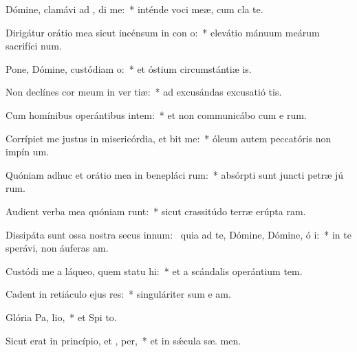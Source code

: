 \item Dómine, clamávi ad , di me:~* inténde voci meæ, cum cla  te.
\item Dirigátur orátio mea sicut incénsum in con o:~* elevátio mánuum meárum sacrifíci num.
\item Pone, Dómine, custódiam  o:~* et óstium circumstántiæ  is.
\item Non declínes cor meum in ver tiæ:~* ad excusándas excusatió  tis.
\item Cum homínibus operántibus intem:~* et non communicábo cum e rum.
\item Corrípiet me justus in misericórdia, et bit me:~* óleum autem peccatóris non impín  um.
\item Quóniam adhuc et orátio mea in benepláci rum:~* absórpti sunt juncti petræ jú rum.
\item Audient verba mea quóniam runt:~* sicut crassitúdo terræ erúpta   ram.
\item Dissipáta sunt ossa nostra secus innum:~\pscross{} quia ad te, Dómine, Dómine, ó i:~* in te sperávi, non áuferas  am.
\item Custódi me a láqueo, quem statu hi:~* et a scándalis operántium tem.
\item Cadent in retiáculo ejus res:~* singuláriter sum e  am.
\item Glória Pa,  lio,~* et Spi to.
\item Sicut erat in princípio, et ,  per,~* et in sǽcula sæ. men.
